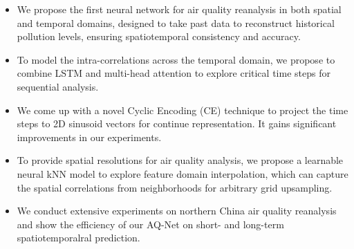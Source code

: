 \begin{itemize}
\item We propose the first neural network for air quality reanalysis in both spatial and temporal domains, designed to take past data to reconstruct historical pollution levels, ensuring spatiotemporal consistency and accuracy. 
\item To model the intra-correlations across the temporal domain, we propose to combine LSTM and multi-head attention to explore critical time steps for sequential analysis.
\item We come up with a novel Cyclic Encoding (CE) technique to project the time steps to 2D sinusoid vectors for continue representation. It gains significant improvements in our experiments.
\item To provide spatial resolutions for air quality analysis, we propose a learnable neural kNN model to explore feature domain interpolation, which can capture the spatial correlations from neighborhoods for arbitrary grid upsampling.
\item We conduct extensive experiments on northern China air quality reanalysis and show the efficiency of our AQ-Net on short- and long-term spatiotemporalral prediction.
\end{itemize}



